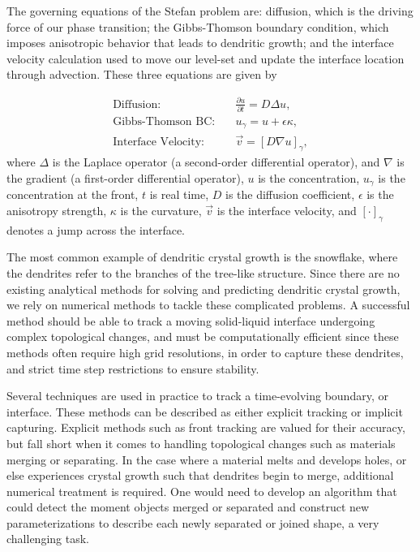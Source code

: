 \documentclass[oneside,12pt,final]{/Applications/TeX/packages/ucthesis-CA2012}
\begin{document}
\begin{mainmatter}
The governing equations of the Stefan problem are: diffusion, which is the driving force of our phase transition; the Gibbs-Thomson boundary condition, which imposes anisotropic behavior that leads to dendritic growth; and the interface velocity calculation used to move our level-set and update the interface location through advection. These three equations are given by

\begin{equation}\label{eqn:governing}
\begin{aligned}
\text{Diffusion:}& \quad \frac{\partial u}{\partial t} = D \Delta u,\\
\text{Gibbs-Thomson BC:}&\quad u_\gamma = u + \epsilon \kappa,\\
\text{Interface Velocity:}&\quad \vec{v} = [D \nabla u]_{\gamma}, 
\end{aligned}
\end{equation}
where $\Delta$ is the Laplace operator (a second-order differential operator), and $\nabla$ is the gradient (a first-order differential operator), $u$ is the concentration, $u_{\gamma}$ is the concentration at the front, $t$ is real time, $D$ is the diffusion coefficient, $\epsilon$ is the anisotropy strength, $\kappa$ is the curvature, $\vec{v}$ is the interface velocity, and $[\cdot]_\gamma$ denotes a jump across the interface.

The most common example of dendritic crystal growth is the snowflake, where the dendrites refer to the branches of the tree-like structure. Since there are no existing analytical methods for solving and predicting dendritic crystal growth, we rely on numerical methods to tackle these complicated problems. A successful method should be able to track a moving solid-liquid interface undergoing complex topological changes, and must be computationally efficient since these methods often require high grid resolutions, in order to capture these dendrites, and strict time step restrictions to ensure stability.

Several techniques are used in practice to track a time-evolving boundary, or interface. These methods can be described as either explicit tracking or implicit capturing. Explicit methods such as front tracking are valued for their accuracy, but fall short when it comes to handling topological changes such as materials merging or separating. In the case where a material melts and develops holes, or else experiences crystal growth such that dendrites begin to merge, additional numerical treatment is required. One would need to develop an algorithm that could detect the moment objects merged or separated and construct new parameterizations to describe each newly separated or joined shape, a very challenging task.


\end{mainmatter}
\end{document}
